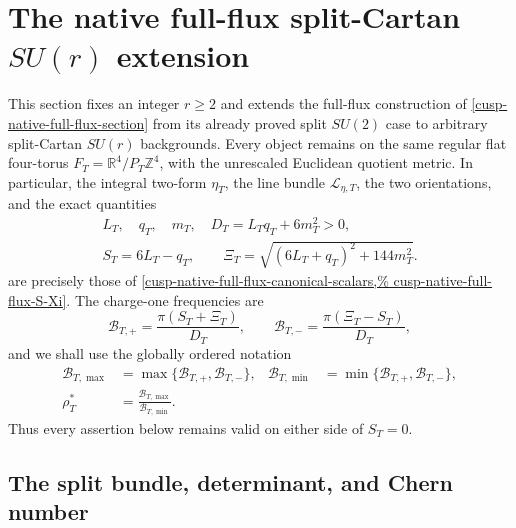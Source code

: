 
\section{The native full-flux split-Cartan \texorpdfstring{\(SU(r)\)}{SU(r)} extension}
\label{cusp-native-full-flux-suN-section}

This section fixes an integer \(r\geq2\) and extends the full-flux
construction of \cref{cusp-native-full-flux-section} from its already proved
split \(SU(2)\) case to arbitrary split-Cartan \(SU(r)\) backgrounds.  Every
object remains on the same regular flat four-torus
\(F_T=\mathbb R^4/P_T\mathbb Z^4\), with the unrescaled Euclidean quotient
metric.  In particular, the integral two-form \(\eta_T\), the line bundle
\(\mathscr L_{\eta,T}\), the two orientations, and the exact quantities
\[
 \begin{gathered}
  L_T,\quad q_T,\quad m_T,\quad D_T=L_T q_T+6m_T^2>0,\\
  S_T=6L_T-q_T,\qquad
  \Xi_T=\sqrt{(6L_T+q_T)^2+144m_T^2}.
 \end{gathered}
\]
are precisely those of
\cref{cusp-native-full-flux-canonical-scalars,%
cusp-native-full-flux-S-Xi}.  The charge-one frequencies are
\begin{equation}
 \mathcal B_{T,+}=\frac{\pi(S_T+\Xi_T)}{D_T},
 \qquad
 \mathcal B_{T,-}=\frac{\pi(\Xi_T-S_T)}{D_T},
 \label{cusp-native-full-flux-suN-signed-frequencies}
\end{equation}
and we shall use the globally ordered notation
\begin{equation}
 \begin{aligned}
  \mathcal B_{T,\max}
  &=\max\{\mathcal B_{T,+},\mathcal B_{T,-}\},&
  \mathcal B_{T,\min}
  &=\min\{\mathcal B_{T,+},\mathcal B_{T,-}\},\\
  \rho_T^*&=\frac{\mathcal B_{T,\max}}{\mathcal B_{T,\min}}.
 \end{aligned}
 \label{cusp-native-full-flux-suN-ordered-frequencies}
\end{equation}
Thus every assertion below remains valid on either side of \(S_T=0\).

\subsection{The split bundle, determinant, and Chern number}

